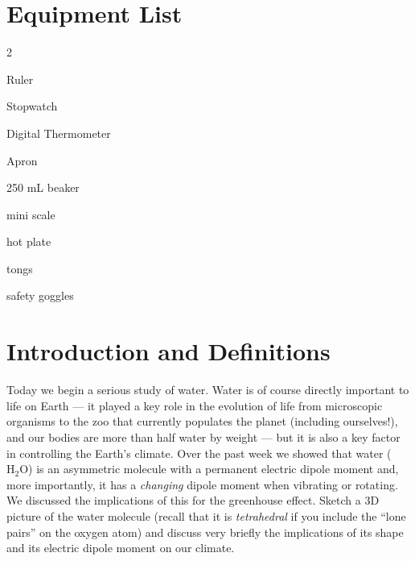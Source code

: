 

\section*{Equipment List}

\begin{multicols}{2}   %
\begin{equipment}
\item Ruler
\item Stopwatch
\item Digital Thermometer
\item Apron
\item 250 mL beaker
\item mini scale
\item hot plate
\item tongs
\item safety goggles
\end{equipment}
\end{multicols}


\section{Introduction and Definitions}

Today we begin a serious study of water.  Water is of course directly important to life on Earth --- it played a key role in the evolution of life from microscopic organisms to the zoo that currently populates the planet (including ourselves!), and our bodies are more than half water by weight --- but it is also a key factor in controlling the Earth's climate.  Over the past week we showed that water ($\text{H}_2\text{O}$) is an asymmetric molecule with a permanent electric dipole moment and, more importantly, it has a {\em changing} dipole moment when vibrating or rotating.  We discussed the implications of this for the greenhouse effect.  Sketch  a 3D picture of the water molecule (recall that it is {\em tetrahedral} if you include the ``lone pairs'' on the oxygen atom) and discuss very briefly the implications of its shape and its electric dipole moment on our climate.

